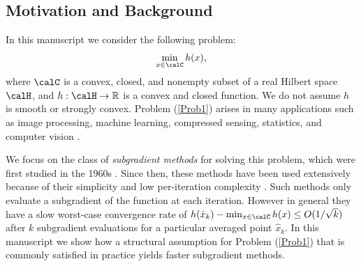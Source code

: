 \documentclass[smallextended]{svjour3}
\begin{document}
\subsection{Motivation and Background}
In this manuscript we consider the following problem:
\begin{eqnarray}\label{Prob1}
\min_{x\in\calC} h(x),
\end{eqnarray}
where $\calC$ is a convex, closed, and nonempty subset of a real Hilbert space $\calH$, and $h:\calH\to\mathbb{R}$ is a convex and closed function. We do not assume $h$ is smooth or strongly convex. Problem (\ref{Prob1}) arises in many applications such as image processing, machine learning, compressed sensing, statistics, and computer vision \cite{hastie2009elements,agrb1992maximum,yang2015rsg}.

We focus on the class of \emph{subgradient methods} for solving this problem, which were first studied in the 1960s \cite{shor2012minimization,goffin1977convergence}. Since then, these methods have been used extensively because of their simplicity and low per-iteration complexity \cite{shor2012minimization,goffin1977convergence,rosenberg1988geometrically,nedic2010effect,nedic2001convergence,nemirovski2009robust}. Such methods only evaluate a subgradient of the function at each iteration. 
However in general they have a slow worst-case convergence rate of $h(\hat{x}_k)-\min_{x\in\calC}h(x)\leq O(1/\sqrt{k})$ after $k$ subgradient evaluations for a particular averaged point $\hat{x}_k$. In this manuscript we show how a structural assumption for Problem (\ref{Prob1}) that is commonly satisfied in practice yields faster subgradient methods.
\end{document}
